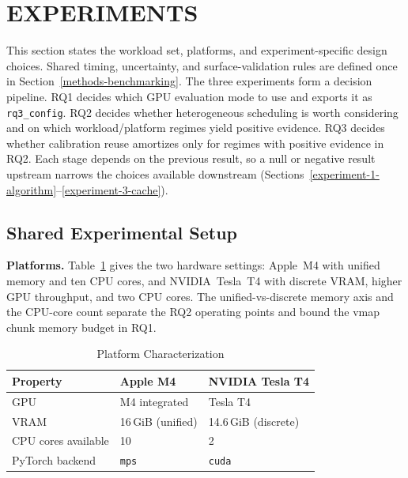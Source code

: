 \section{EXPERIMENTS}\label{experiments}

This section states the workload set, platforms, and
experiment-specific design choices. Shared timing, uncertainty,
and surface-validation rules are defined once in
Section~\ref{methods-benchmarking}. The three experiments form
a decision pipeline. RQ1 decides which GPU evaluation mode to
use and exports it as \texttt{rq3\_config}. RQ2 decides
whether heterogeneous scheduling is worth considering and on
which workload/platform regimes yield positive evidence. RQ3
decides whether calibration reuse amortizes only for regimes
with positive evidence in RQ2. Each stage depends on the
previous result, so a null or negative result upstream narrows
the choices available downstream
(Sections~\ref{experiment-1-algorithm}--\ref{experiment-3-cache}).

\subsection{Shared Experimental
Setup}\label{workload-set-and-platforms}

\textbf{Platforms.} Table~\ref{tab:platforms} gives the two
hardware settings: Apple~M4 with unified memory and ten CPU
cores, and NVIDIA~Tesla~T4 with discrete VRAM, higher GPU
throughput, and two CPU cores. The unified-vs-discrete
memory axis and the CPU-core count separate the RQ2 operating
points and bound the vmap chunk memory budget in RQ1.

\begin{table}[t]
  \caption{Platform Characterization}
  \label{tab:platforms}
  \centering
  \begin{tabular}{lll}
    \toprule
    Property & Apple M4 & NVIDIA Tesla T4 \\
    \midrule
    GPU & M4 integrated & Tesla T4 \\
    VRAM & 16\,GiB (unified) & 14.6\,GiB (discrete) \\
    CPU cores available & 10 & 2 \\
    PyTorch backend & \texttt{mps} & \texttt{cuda} \\
    \bottomrule
  \end{tabular}
\end{table}

